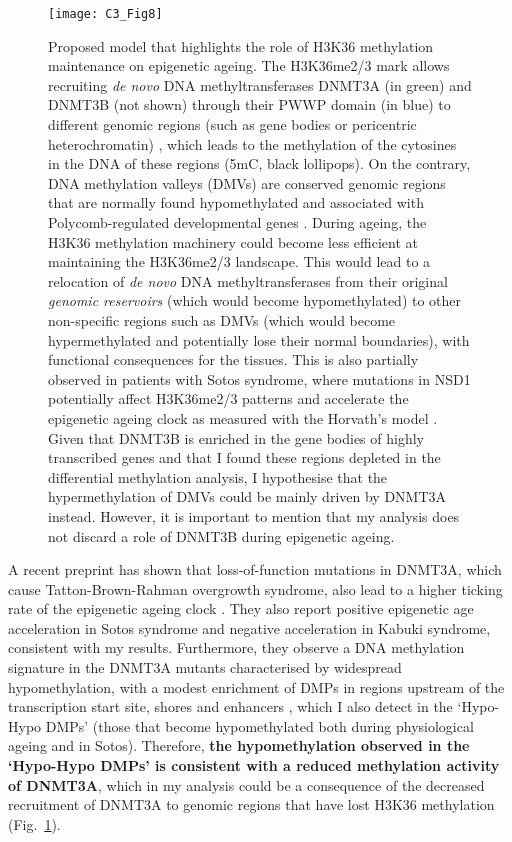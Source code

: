 \begin{figure}[htbp!] 
	\centering    
	\texttt{[image: C3\_Fig8]}
	\vspace*{1 mm}
	\caption[Proposed model that highlights the role of H3K36 methylation maintenance on epigenetic ageing]{Proposed model that highlights the role of H3K36 methylation maintenance on epigenetic ageing. The H3K36me2/3 mark allows recruiting \textit{de novo} DNA methyltransferases DNMT3A (in green) and DNMT3B (not shown) through their PWWP domain (in blue) to different genomic regions (such as gene bodies or pericentric heterochromatin) \cite{Baubec2015,Chantalat2011,Chen2004}, which leads to the methylation of the cytosines in the DNA of these regions (\acrshort{5mC}, black lollipops). On the contrary, DNA methylation valleys (\acrshort{DMV}s) are conserved genomic regions that are normally found hypomethylated and associated with Polycomb-regulated developmental genes \cite{Xie2013,Long2013,Jeong2013,Li2018}. During ageing, the H3K36 methylation machinery could become less efficient at maintaining the H3K36me2/3 landscape. This would lead to a relocation of \textit{de novo} DNA methyltransferases from their original \textit{genomic reservoirs} (which would become hypomethylated) to other non-specific regions such as DMVs (which would become hypermethylated and potentially lose their normal boundaries), with functional consequences for the tissues. This is also partially observed in patients with Sotos syndrome, where mutations in NSD1 potentially affect H3K36me2/3 patterns and accelerate the epigenetic ageing clock as measured with the Horvath's model \cite{Horvath2013}. Given that DNMT3B is enriched in the gene bodies of highly transcribed genes \cite{Baubec2015} and that I found these regions depleted in the differential methylation analysis, I hypothesise that the hypermethylation of DMVs could be mainly driven by DNMT3A instead. However, it is important to mention that my analysis does not discard a role of DNMT3B during epigenetic ageing.}
	\label{fig:c3_fig8}
\end{figure}

\bigskip

A recent preprint has shown that loss-of-function mutations in DNMT3A, which cause Tatton-Brown-Rahman overgrowth syndrome, also lead to a higher ticking rate of the epigenetic ageing clock \cite{Jeffries2018}. They also report positive epigenetic age acceleration in Sotos syndrome and negative acceleration in Kabuki syndrome, consistent with my results. Furthermore, they observe a DNA methylation signature in the DNMT3A mutants characterised by widespread hypomethylation, with a modest enrichment of DMPs in regions upstream of the transcription start site, shores and enhancers \cite{Jeffries2018}, which I also detect in the `Hypo-Hypo DMPs' (those that become hypomethylated both during physiological ageing and in Sotos). Therefore, \textbf{the hypomethylation observed in the `Hypo-Hypo DMPs' is consistent with a reduced methylation activity of DNMT3A}, which in my analysis could be a consequence of the decreased recruitment of DNMT3A to genomic regions that have lost H3K36 methylation (Fig.~\ref{fig:c3_fig8}).


